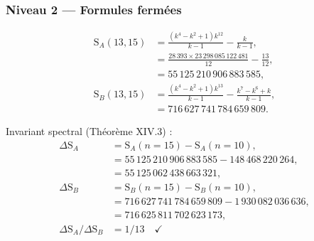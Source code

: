 \documentclass[11pt,a4paper]{article}
\newcommand{\SA}{\mathrm{S}_A}
\newcommand{\SB}{\mathrm{S}_B}
\begin{document}
\subsubsection{Niveau 2 --- Formules fermées}
\begin{align*}
\SA(13,15) &= \frac{(k^{4}-k^{2}+1)k^{12}}{k-1}-\frac{k}{k-1},\\
&= \frac{28\,393\times23\,298\,085\,122\,481}{12}-\frac{13}{12},\\
&=55\,125\,210\,906\,883\,585,\\
\SB(13,15) &= \frac{(k^{4}-k^{2}+1)k^{13}}{k-1}
-\frac{k^{7}-k^{6}+k}{k-1},\\
&=716\,627\,741\,784\,659\,809.
\end{align*}

Invariant spectral (Théorème XIV.3) :
\begin{align*}
\Delta\SA &= \SA(n{=}15)-\SA(n{=}10),\\
&=55\,125\,210\,906\,883\,585-148\,468\,220\,264,\\
&=55\,125\,062\,438\,663\,321,\\
\Delta\SB &= \SB(n{=}15)-\SB(n{=}10),\\
&=716\,627\,741\,784\,659\,809-1\,930\,082\,036\,636,\\
&=716\,625\,811\,702\,623\,173,\\
\Delta\SA / \Delta\SB &= 1/13 \quad \checkmark
\end{align*}
\end{document}

